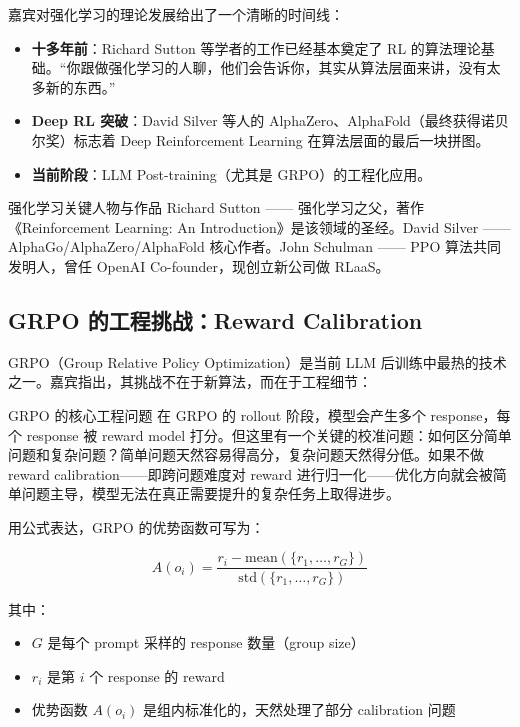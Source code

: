 \documentclass[a4paper]{article}
\begin{document}
嘉宾对强化学习的理论发展给出了一个清晰的时间线：

\begin{itemize}
    \item \textbf{十多年前}：Richard Sutton 等学者的工作已经基本奠定了 RL 的算法理论基础。``你跟做强化学习的人聊，他们会告诉你，其实从算法层面来讲，没有太多新的东西。''
    \item \textbf{Deep RL 突破}：David Silver 等人的 AlphaZero、AlphaFold（最终获得诺贝尔奖）标志着 Deep Reinforcement Learning 在算法层面的最后一块拼图。
    \item \textbf{当前阶段}：LLM Post-training（尤其是 GRPO）的工程化应用。
\end{itemize}

\begin{knowledgebox}{强化学习关键人物与作品}
Richard Sutton —— 强化学习之父，著作《Reinforcement Learning: An Introduction》是该领域的圣经。David Silver —— AlphaGo/AlphaZero/AlphaFold 核心作者。John Schulman —— PPO 算法共同发明人，曾任 OpenAI Co-founder，现创立新公司做 RLaaS。
\end{knowledgebox}

\subsection{GRPO 的工程挑战：Reward Calibration}

GRPO（Group Relative Policy Optimization）是当前 LLM 后训练中最热的技术之一。嘉宾指出，其挑战不在于新算法，而在于工程细节：

\begin{importantbox}{GRPO 的核心工程问题}
在 GRPO 的 rollout 阶段，模型会产生多个 response，每个 response 被 reward model 打分。但这里有一个关键的校准问题：如何区分简单问题和复杂问题？简单问题天然容易得高分，复杂问题天然得分低。如果不做 reward calibration——即跨问题难度对 reward 进行归一化——优化方向就会被简单问题主导，模型无法在真正需要提升的复杂任务上取得进步。
\end{importantbox}

用公式表达，GRPO 的优势函数可写为：

$$
A(o_i) = \frac{r_i - \text{mean}(\{r_1, \dots, r_G\})}{\text{std}(\{r_1, \dots, r_G\})}
$$

其中：
\begin{itemize}
    \item $G$ 是每个 prompt 采样的 response 数量（group size）
    \item $r_i$ 是第 $i$ 个 response 的 reward
    \item 优势函数 $A(o_i)$ 是组内标准化的，天然处理了部分 calibration 问题
\end{itemize}
\end{document}
